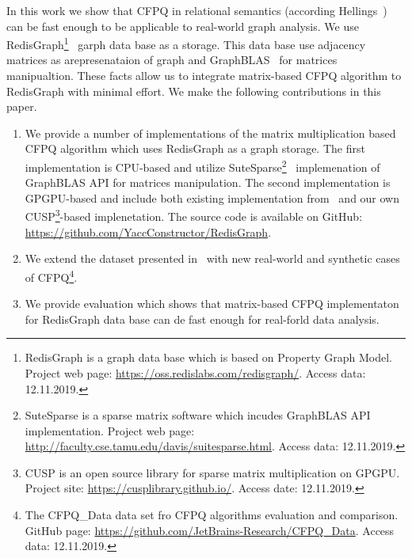 In this work we show that CFPQ in relational semantics (according Hellings~\cite{hellingsRelational}) can be fast enough to be applicable to real-world graph analysis.
We use RedisGraph\footnote{RedisGraph is a graph data base which is based on Property Graph Model. Project web page: \url{https://oss.redislabs.com/redisgraph/}. Access data: 12.11.2019.}~\cite{8778293} garph data base as a storage.
This data base use adjacency matrices as arepresenataion of graph and GraphBLAS~\cite{7761646} for matrices manipualtion.
These facts allow us to integrate matrix-based CFPQ algorithm to RedisGraph with minimal effort.
We make the following contributions in this paper.
\begin{enumerate}
\item We provide a number of implementations of the matrix multiplication based CFPQ algorithm which uses RedisGraph as a graph storage.
The first implementation is CPU-based and utilize SuteSparse\footnote{SuteSparse is a sparse matrix software which incudes GraphBLAS API implementation. Project web page: \url{http://faculty.cse.tamu.edu/davis/suitesparse.html}. Access data: 12.11.2019.}~\cite{Davis2018Algorithm9S} implemenation of GraphBLAS API for matrices manipulation.
The second implementation is GPGPU-based and include both existing implementation from~\cite{Mishin:2019:ECP:3327964.3328503} and our own CUSP\footnote{CUSP is an open source library for sparse matrix multiplication on GPGPU. Project site: \url{https://cusplibrary.github.io/}. Access date: 12.11.2019.}-based implenetation.
The source code is available on GitHub: \url{https://github.com/YaccConstructor/RedisGraph}.
\item We extend the dataset presented in~\cite{Mishin:2019:ECP:3327964.3328503} with new real-world and synthetic cases of CFPQ\footnote{The CFPQ\_Data data set fro CFPQ algorithms evaluation and comparison. GitHub page: \url{https://github.com/JetBrains-Research/CFPQ_Data}. Access data: 12.11.2019.}.  
\item We provide evaluation which shows that matrix-based CFPQ implementaton for RedisGraph data base can de fast enough for real-forld data analysis.
\end{enumerate}
